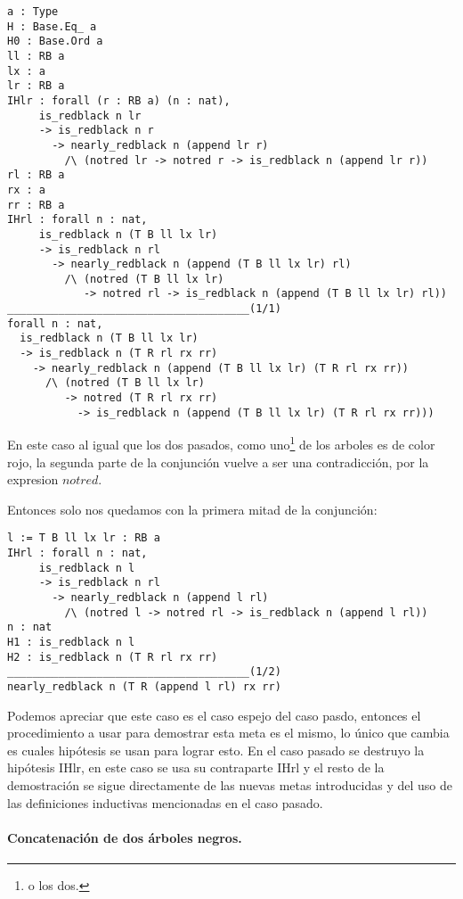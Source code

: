 \begin{verbatim}
a : Type
H : Base.Eq_ a
H0 : Base.Ord a
ll : RB a
lx : a
lr : RB a
IHlr : forall (r : RB a) (n : nat),
     is_redblack n lr
     -> is_redblack n r
       -> nearly_redblack n (append lr r)
         /\ (notred lr -> notred r -> is_redblack n (append lr r))
rl : RB a
rx : a
rr : RB a
IHrl : forall n : nat,
     is_redblack n (T B ll lx lr)
     -> is_redblack n rl
       -> nearly_redblack n (append (T B ll lx lr) rl)
         /\ (notred (T B ll lx lr)
            -> notred rl -> is_redblack n (append (T B ll lx lr) rl))
______________________________________(1/1)
forall n : nat,
  is_redblack n (T B ll lx lr)
  -> is_redblack n (T R rl rx rr)
    -> nearly_redblack n (append (T B ll lx lr) (T R rl rx rr))
      /\ (notred (T B ll lx lr)
         -> notred (T R rl rx rr)
           -> is_redblack n (append (T B ll lx lr) (T R rl rx rr)))
\end{verbatim}

En este caso al igual que los dos pasados, como uno\footnote{o los dos.} de los arboles es de
color rojo, la segunda parte de la conjunci\'on vuelve a ser una contradicci\'on, por la expresion
$notred$.

Entonces solo nos quedamos con la primera mitad de la conjunci\'on:

\begin{verbatim}
l := T B ll lx lr : RB a
IHrl : forall n : nat,
     is_redblack n l
     -> is_redblack n rl
       -> nearly_redblack n (append l rl)
         /\ (notred l -> notred rl -> is_redblack n (append l rl))
n : nat
H1 : is_redblack n l
H2 : is_redblack n (T R rl rx rr)
______________________________________(1/2)
nearly_redblack n (T R (append l rl) rx rr)
\end{verbatim}

Podemos apreciar que este caso es el caso espejo del caso pasdo, entonces el procedimiento a usar
para demostrar esta meta es el mismo, lo \'unico que cambia es cuales hip\'otesis se usan para
lograr esto. En el caso pasado se destruyo la hip\'otesis IHlr, en este caso se usa su contraparte
IHrl y el resto de la demostraci\'on se sigue directamente de las nuevas metas introducidas y del
uso de las definiciones inductivas mencionadas en el caso pasado.

\paragraph{Concatenaci\'on de dos \'arboles negros.}


